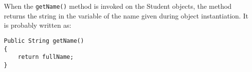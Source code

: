 When the \verb|getName()| method is invoked on the Student objects, the
method returns the string in the variable of the name given during
object instantiation. It is probably written as:

\begin{verbatim}
Public String getName()
{
	return fullName;
}
\end{verbatim}
